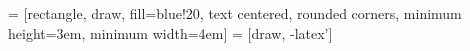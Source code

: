 \documentclass{../common/latex_classes/pdf_document}
\begin{document}
	\pagestyle{empty}
	 = [rectangle, draw, fill=blue!20, text centered, rounded corners, minimum height=3em, minimum width=4em]
	 = [draw, -latex']
	\titleToc{}
\end{document}

